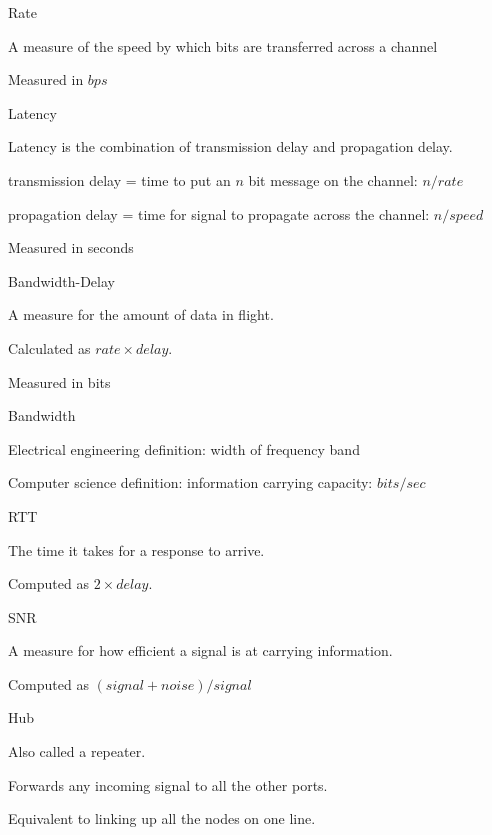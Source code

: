 \documentclass[main.tex]{subfiles}
\begin{document}
\small


\begin{card}{Rate}
\item A measure of the speed by which bits are transferred across a channel
\item Measured in $bps$
\end{card}


\begin{card}{Latency}
\item Latency is the combination of transmission delay and propagation delay.
\item transmission delay = time to put an $n$ bit message on the channel: $n/rate$
\item propagation delay = time for signal to propagate across the channel: $n/speed$
\item Measured in seconds
\end{card}

\begin{card}{Bandwidth-Delay}
\item A measure for the amount of data in flight.
\item Calculated as $rate \times delay$.
\item Measured in bits
\end{card}

\begin{card}{Bandwidth}
\item Electrical engineering definition: width of frequency band
\item Computer science definition: information carrying capacity: $bits/sec$
\end{card}

\begin{card}{RTT}
\item The time it takes for a response to arrive.
\item Computed as $2\times delay$.
\end{card}

\begin{card}{SNR}
\item A measure for how efficient a signal is at carrying information.
\item Computed as $(signal + noise)/signal$
\end{card}

\full{}
\begin{card}{Hub}
\item Also called a repeater.
\item Forwards any incoming signal to all the other ports.
\item Equivalent to linking up all the nodes on one line.
\end{card}
\end{document}
